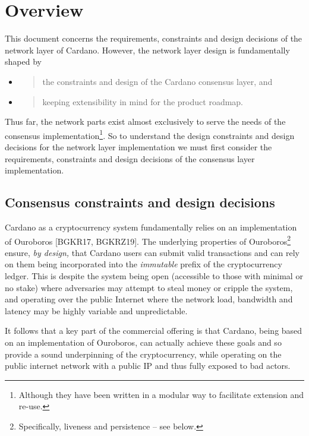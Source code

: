 \documentclass[11pt,a4paper]{article}
\begin{document}
\section{Overview}
\label{overview}

This document concerns the requirements, constraints and design
decisions of the network layer of Cardano. However, the network layer
design is fundamentally shaped by

\begin{itemize}
\item
  \begin{quote}
  the constraints and design of the Cardano consensus layer, and
  \end{quote}
\item
  \begin{quote}
  keeping extensibility in mind for the product roadmap.
  \end{quote}
\end{itemize}

Thus far, the network parts exist almost exclusively to serve the needs
of the consensus implementation\footnote{Although they have been written
  in a modular way to facilitate extension and re-use.}. So to
understand the design constraints and design decisions for the network
layer implementation we must first consider the requirements,
constraints and design decisions of the consensus layer implementation.

\subsection{Consensus constraints and design decisions}
\label{consensus-constraints-and-design-decisions}

Cardano as a cryptocurrency system fundamentally relies on an
implementation of Ouroboros {[}BGKR17, BGKRZ19{]}. The underlying
properties of Ouroboros\footnote{Specifically, liveness and persistence
  -- see below.} ensure, \emph{by design,} that Cardano users can submit
valid transactions and can rely on them being incorporated into the
\emph{immutable} prefix of the cryptocurrency ledger. This is despite
the system being open (accessible to those with minimal or no stake)
where adversaries may attempt to steal money or cripple the system, and
operating over the public Internet where the network load, bandwidth and
latency may be highly variable and unpredictable.

It follows that a key part of the commercial offering is that Cardano,
being based on an implementation of Ouroboros, can actually achieve
these goals and so provide a sound underpinning of the cryptocurrency,
while operating on the public internet network with a public IP and thus
fully exposed to bad actors.
\end{document}
